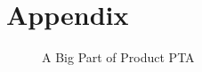 \section{Appendix}
\begin{figure}
    \centering
    \resizebox{.5\textwidth}{!}{
        
        }
    \caption{A Big Part of Product PTA}
    \label{fig:product}  
\end{figure}
